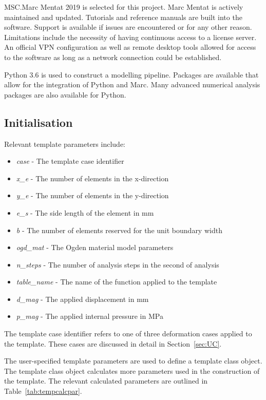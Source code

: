 MSC.Marc Mentat 2019 is selected for this project. Marc Mentat is actively maintained and updated. Tutorials and reference manuals are built into the software. Support is available if issues are encountered or for any other reason. Limitations include the necessity of having continuous access to a license server. An official VPN configuration as well as remote desktop tools allowed for access to the software as long as a network connection could be established.

Python 3.6 is used to construct a modelling pipeline. Packages are available that allow for the integration of Python and Marc. Many advanced numerical analysis packages are also available for Python.

\subsection{Initialisation}
\label{ssec:init}

Relevant template parameters include:

\begin{itemize}
	\item \textit{case} - The template case identifier
	\item \textit{x\_e} - The number of elements in the x-direction 
	\item \textit{y\_e} - The number of elements in the y-direction
	\item \textit{e\_s} - The side length of the element in mm
	\item \textit{b} - The number of elements reserved for the unit boundary width
	\item \textit{ogd\_mat} - The Ogden material model parameters
	\item \textit{n\_steps} - The number of analysis steps in the second of analysis
	\item \textit{table\_name} - The name of the function applied to the template
	\item \textit{d\_mag} - The applied displacement in mm
	\item \textit{p\_mag} - The applied internal pressure in MPa
\end{itemize}

The template case identifier refers to one of three deformation cases applied to the template. These cases are discussed in detail in Section~\ref{sec:UC}.

The user-specified template parameters are used to define a template class object. The template class object calculates more parameters used in the construction of the template. The relevant calculated parameters are outlined in Table~\ref{tab:tempcalcpar}.

